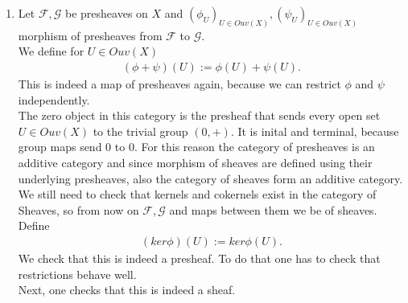 \begin{exercise}{3}
    \begin{enumerate}
        \item Let $\mathcal{F}, \mathcal{G}$ be presheaves on $X$ and $(\phi_U)_{U\in Ouv(X)}, 
        (\psi_U)_{U\in Ouv(X)}$ morphism of presheaves from $\mathcal{F}$ to $\mathcal{G}$.\\
        We define for $U\in Ouv(X)$
        \begin{align*}
            (\phi+\psi)(U):=\phi(U)+\psi(U).
        \end{align*}
        This is indeed a map of presheaves again, because we can
        restrict $\phi$ and $\psi$ independently.\\
        The zero object in this category is the presheaf that sends 
        every open set $U\in Ouv(X)$ to the trivial group $(0,+)$. 
        It is inital and terminal, because group maps send $0$ to $0$.
        For this reason the category of presheaves is an additive category
        and since morphism of sheaves are defined using their underlying
        presheaves, also the category of sheaves form an additive category.\\
        We still need to check that kernels and cokernels exist in the 
        category of Sheaves, so from now on $\mathcal{F},\mathcal{G}$
        and maps between them we be of sheaves.\\
        Define 
        \begin{align*}
            (ker\phi)(U):=ker\phi(U).
        \end{align*}
        We check that this is indeed a presheaf. To do that one has 
        to check that restrictions behave well.\\
        Next, one checks that this is indeed a sheaf.

    \end{enumerate}
\end{exercise}

